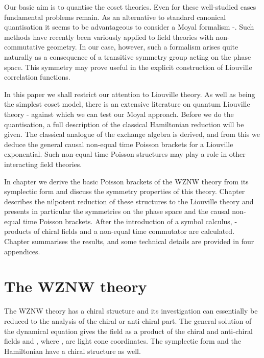 \documentclass[a4paper,12pt]{article}
\providecommand{\rr}{\mathbb{R}}
\begin{document}
\noindent
Our basic aim is to quantise the coset theories.
Even for these well-studied cases fundamental problems remain.
As an alternative to standard  canonical quantisation
\cite{Thorn, Neveu, OW, FJW} it seems
to be advantageous to consider a Moyal formalism
\cite{Weyl}-\cite{Berezin}. Such methods have recently been
variously applied to field theories with non-commutative geometry.
In our case, however, such
a formalism arises quite naturally as a consequence of a transitive
symmetry group acting on the phase space.
This symmetry may prove useful in the explicit construction
of Liouville correlation functions.

\noindent
In this paper we shall restrict our attention to Liouville theory.  As
well as being the simplest coset model, there is an extensive
literature on quantum Liouville theory \cite{Thorn}-\cite{OW} against
which we can test our Moyal approach.  Before we do the quantisation,
a full description of the classical Hamiltonian reduction will be
given.  The classical analogue of the exchange algebra is derived, and
from this we deduce the general causal non-equal time Poisson brackets
for a Liouville exponential. Such non-equal time Poisson structures
may play a role in other interacting field theories.

\noindent
In chapter \coordHE{} we derive the basic Poisson brackets of the \myHighlight{$SL(2,\rr)$}\coordHE{}
WZNW theory from its symplectic form and discuss the symmetry
properties of this theory. Chapter \coordHE{} describes the nilpotent
reduction of these structures to the Liouville theory and presents in
particular the symmetries on the phase space and the causal non-equal
time Poisson brackets. After the introduction of a symbol calculus,
\myHighlight{$*$}\coordHE{}-products of chiral fields and a non-equal time commutator are
calculated. Chapter \coordHE{} summarises the results, and
some technical details are provided in four appendices.


\setcounter{equation}{0}
\section{The \myHighlight{$SL(2,\rr)$}\coordHE{} WZNW theory}

\noindent
The WZNW theory has a chiral structure and its investigation can
essentially be reduced to the analysis of the chiral or anti-chiral
part. The general solution of the dynamical equation gives the
\myHighlight{$SL(2,\rr)$}\coordHE{} field \coordHE{} as a product
of the chiral and anti-chiral fields \coordHE{} and \coordHE{},
 where \coordHE{}, \coordHE{} are
light cone coordinates. The symplectic form and the Hamiltonian have a
chiral structure as well.
\end{document}
